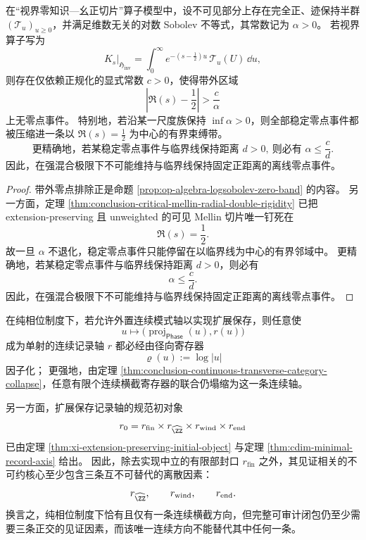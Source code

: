 \begin{theorem}[混合强度的非退化强制临界线局域化]\label{thm:conclusion-logsobolev-mixing-forces-critical-localization}
在“视界零知识---幺正切片”算子模型中，设不可见部分上存在完全正、迹保持半群 \((\mathcal T_u)_{u\ge 0}\)，并满足维数无关的对数 Sobolev 不等式，其常数记为 \(\alpha>0\)。
若视界算子写为
\[
K_s\big|_{\mathfrak H_{\mathrm{inv}}}
=
\int_0^\infty e^{-(s-\frac12)u}\,\mathcal T_u(U)\,\dd u,
\]
则存在仅依赖正规化的显式常数 \(c>0\)，使得带外区域
\[
\left|\Re(s)-\frac12\right|>\frac{c}{\alpha}
\]
上无零点事件。
特别地，若沿某一尺度族保持 \(\inf \alpha>0\)，则全部稳定零点事件都被压缩进一条以 \(\Re(s)=\frac12\) 为中心的有界束缚带。
\[
\text{更精确地，若某稳定零点事件与临界线保持距离 }d>0,\ \text{则必有 }\alpha\le \frac{c}{d}.
\]
因此，在强混合极限下不可能维持与临界线保持固定正距离的离线零点事件。
\end{theorem}

\begin{proof}
带外零点排除正是命题 \ref{prop:op-algebra-logsobolev-zero-band} 的内容。
另一方面，定理 \ref{thm:conclusion-critical-mellin-radial-double-rigidity} 已把 extension-preserving 且 unweighted 的可见 Mellin 切片唯一钉死在
\[
\Re(s)=\frac12.
\]
故一旦 \(\alpha\) 不退化，稳定零点事件只能停留在以临界线为中心的有界邻域中。
更精确地，若某稳定零点事件与临界线保持距离 \(d>0\)，则必有
\[
\alpha\le \frac{c}{d}.
\]
因此，在强混合极限下不可能维持与临界线保持固定正距离的离线零点事件。
\end{proof}

\begin{theorem}[连续横截唯一性与见证核的乘积闭包]\label{thm:conclusion-unique-continuous-transverse-and-witness-product-core}
在纯相位制度下，若允许外置连续模式轴以实现扩展保存，则任意使
\[
u\longmapsto \bigl(\operatorname{proj}_{\mathsf{Phase}}(u),r(u)\bigr)
\]
成为单射的连续记录轴 \(r\) 都必经由径向寄存器
\[
\varrho(u):=\log|u|
\]
因子化；
更强地，由定理 \ref{thm:conclusion-continuous-transverse-category-collapse}，任意有限个连续横截寄存器的联合仍塌缩为这一条连续轴。

另一方面，扩展保存记录轴的规范初对象
\[
r_0=r_{\mathrm{fin}}\times r_{\widehat{\ZZ}}\times r_{\mathrm{wind}}\times r_{\mathrm{end}}
\]
已由定理 \ref{thm:xi-extension-preserving-initial-object} 与定理 \ref{thm:cdim-minimal-record-axis} 给出。
因此，除去实现中立的有限部封口 \(r_{\mathrm{fin}}\) 之外，其见证相关的不可约核心至少包含三条互不可替代的离散因素：
\[
r_{\widehat{\ZZ}},
\qquad
r_{\mathrm{wind}},
\qquad
r_{\mathrm{end}}.
\]
换言之，纯相位制度下恰有且仅有一条连续横截方向，但完整可审计闭包仍至少需要三条正交的见证因素，而该唯一连续方向不能替代其中任何一条。
\end{theorem}


